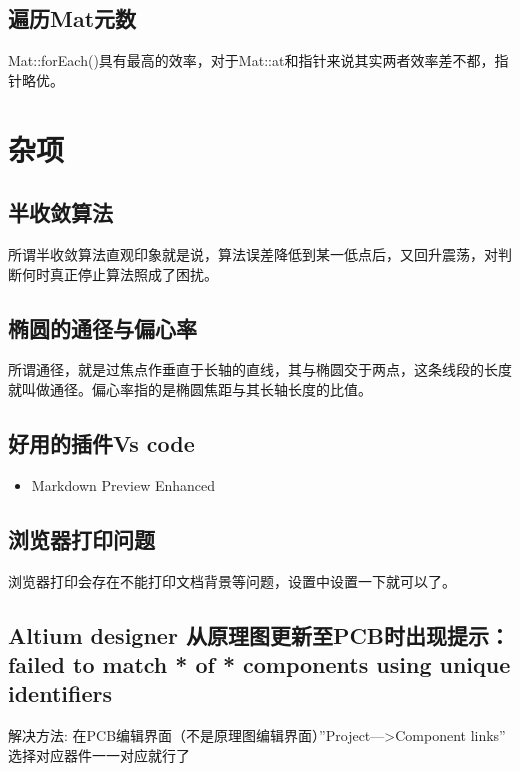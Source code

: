 \documentclass[12pt,twoside]{report}
\begin{document}
\section{遍历Mat元数}
Mat::forEach()具有最高的效率，对于Mat::at和指针来说其实两者效率差不都，指针略优。

\chapter{杂项}

\section{半收敛算法}
所谓半收敛算法直观印象就是说，算法误差降低到某一低点后，又回升震荡，对判断何时真正停止算法照成了困扰。

\section{椭圆的通径与偏心率}
所谓通径，就是过焦点作垂直于长轴的直线，其与椭圆交于两点，这条线段的长度就叫做通径。偏心率指的是椭圆焦距与其长轴长度的比值。

\section{好用的插件Vs code}

\begin{leftbar}
    \begin{itemize}
        \item Markdown Preview Enhanced
    \end{itemize}
\end{leftbar}

\section{浏览器打印问题}
浏览器打印会存在不能打印文档背景等问题，设置中设置一下就可以了。

\section{Altium designer 从原理图更新至PCB时出现提示：failed to match * of * components using unique identifiers }
解决方法: 在PCB编辑界面（不是原理图编辑界面）”Project—>Component links” 选择对应器件一一对应就行了
\end{document}
